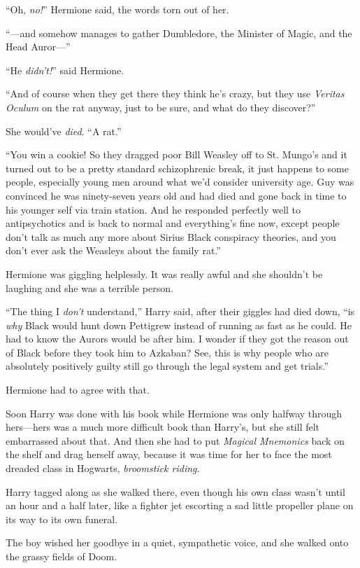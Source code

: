 “Oh, \emph{no!}” Hermione said, the words torn out of her.

“—and somehow manages to gather Dumbledore, the Minister of Magic, and the Head Auror—”

“He \emph{didn’t!}” said Hermione.

“And of course when they get there they think he’s crazy, but they use \emph{Veritas Oculum} on the rat anyway, just to be sure, and what do they discover?”

She would’ve \emph{died}. “A rat.”

“You win a cookie! So they dragged poor Bill Weasley off to St. Mungo’s and it turned out to be a pretty standard schizophrenic break, it just happens to some people, especially young men around what we’d consider university age. Guy was convinced he was ninety-seven years old and had died and gone back in time to his younger self via train station. And he responded perfectly well to antipsychotics and is back to normal and everything’s fine now, except people don’t talk as much any more about Sirius Black conspiracy theories, and you don’t ever ask the Weasleys about the family rat.”

Hermione was giggling helplessly. It was really awful and she shouldn’t be laughing and she was a terrible person.

“The thing I \emph{don’t} understand,” Harry said, after their giggles had died down, “is \emph{why} Black would hunt down Pettigrew instead of running as fast as he could. He had to know the Aurors would be after him. I wonder if they got the reason out of Black before they took him to Azkaban? See, this is why people who are absolutely positively guilty still go through the legal system and get trials.”

Hermione had to agree with that.

Soon Harry was done with his book while Hermione was only halfway through hers—hers was a much more difficult book than Harry’s, but she still felt embarrassed about that. And then she had to put \emph{Magical Mnemonics} back on the shelf and drag herself away, because it was time for her to face the most dreaded class in Hogwarts, \emph{broomstick riding}.

Harry tagged along as she walked there, even though his own class wasn’t until an hour and a half later, like a fighter jet escorting a sad little propeller plane on its way to its own funeral.

The boy wished her goodbye in a quiet, sympathetic voice, and she walked onto the grassy fields of Doom.

